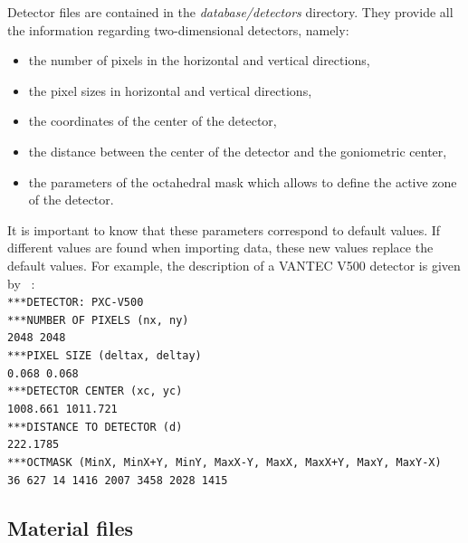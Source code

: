 \documentclass[french,a4paper]{report}
\begin{document}
Detector files are contained in the \textit{database/detectors} directory. They provide all the information regarding two-dimensional detectors, namely:
\begin{itemize}
\item{the number of pixels in the horizontal and vertical directions,}
\item{the pixel sizes in horizontal and vertical directions,}
\item{the coordinates of the center of the detector,}
\item{the distance between the center of the detector and the goniometric center,}
\item{the parameters of the octahedral mask which allows to define the active zone of the detector.}
\end{itemize}
It is important to know that these parameters correspond to default values. If different values are found when importing data, these new values replace the default values. For example, the description of a VANTEC V500 detector is given by ~:\\
\texttt{***DETECTOR: PXC-V500} \\
\texttt{***NUMBER OF PIXELS (nx, ny)} \\
\texttt{2048     2048} \\
\texttt{***PIXEL SIZE (deltax, deltay)} \\
\texttt{0.068    0.068} \\
\texttt{***DETECTOR CENTER (xc, yc)} \\
\texttt{1008.661      1011.721} \\
\texttt{***DISTANCE TO DETECTOR (d)} \\
\texttt{222.1785} \\
\texttt{***OCTMASK (MinX, MinX+Y, MinY, MaxX-Y, MaxX, MaxX+Y, MaxY, MaxY-X)} \\
\texttt{36  627  14  1416  2007  3458   2028  1415 } \\

\label{sec_fichierdetecteur}

\subsection{Material files}
\end{document}
